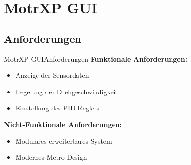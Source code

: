 \section{MotrXP GUI}
	
	\subsection{Anforderungen}
		\begin{frame}{MotrXP GUI}{Anforderungen}
		\textbf{Funktionale Anforderungen:}
	  		\begin{itemize}
	   	 		\item Anzeige der Sensordaten
	    		\item Regelung der Drehgeschwindigkeit
	    		\item Einstellung des PID Reglers
	  		\end{itemize}
	  		\textbf{Nicht-Funktionale Anforderungen:}
	  		\begin{itemize}
	   	 		\item Modulares erweiterbares System 
	    		\item Modernes Metro Design
	  		\end{itemize}
		\end{frame}

